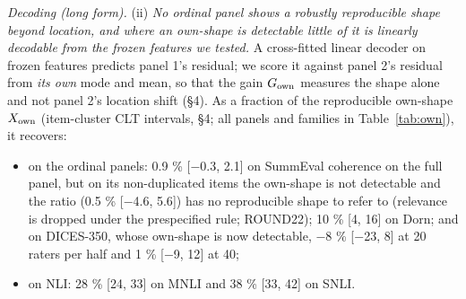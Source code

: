 \documentclass{article}
\providecommand{\tightlist}{\setlength{\itemsep}{0pt}\setlength{\parskip}{0pt}}
\begin{document}
\emph{Decoding (long form).} (ii) \emph{No ordinal panel shows a robustly reproducible shape beyond location, and where an own-shape is detectable little of it is linearly decodable from the frozen features we tested.} A cross-fitted linear decoder on frozen features predicts panel 1's residual; we score it against panel 2's residual from \emph{its own} mode and mean, so that the gain \(G_{\rm own}\) measures the shape alone and not panel 2's location shift (\S{}4). As a fraction of the reproducible own-shape \(X_{\rm own}\) (item-cluster CLT intervals, \S{}4; all panels and families in Table~\ref{tab:own}), it recovers:

\begin{itemize}
\tightlist
\item
  on the ordinal panels: 0.9 \% {[}$-$0.3, 2.1{]} on SummEval coherence on the full panel, but on its non-duplicated items the own-shape is not detectable and the ratio (0.5 \% {[}$-$4.6, 5.6{]}) has no reproducible shape to refer to (relevance is dropped under the prespecified rule; ROUND22); 10 \% {[}4, 16{]} on Dorn; and on DICES-350, whose own-shape is now detectable, $-$8 \% {[}$-$23, 8{]} at 20 raters per half and 1 \% {[}$-$9, 12{]} at 40;
\item
  on NLI: 28 \% {[}24, 33{]} on MNLI and 38 \% {[}33, 42{]} on SNLI.
\end{itemize}
\end{document}
